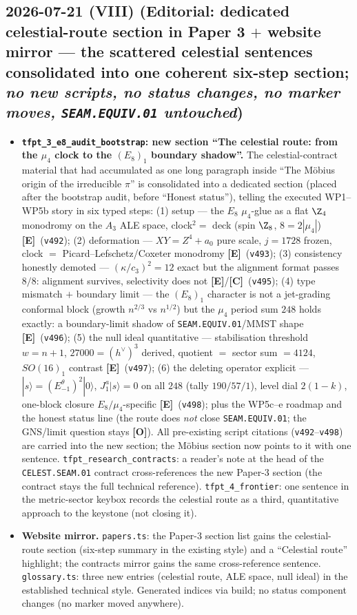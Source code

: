 \documentclass[11pt]{article}
\providecommand{\mE}{\textbf{[E]}}\providecommand{\mC}{\textbf{[C]}}
\providecommand{\mO}{\textbf{[O]}}\providecommand{\mX}{\textbf{[X]}}
\providecommand{\cthree}{c_3}\providecommand{\phiz}{\varphi_0^{\mathrm{ret}}}
\begin{document}
\subsection*{2026-07-21 (VIII) (Editorial: dedicated celestial-route section in Paper 3 $+$ website mirror --- the scattered celestial sentences consolidated into one coherent six-step section; \emph{no new scripts, no status changes, no marker moves, \texttt{SEAM.EQUIV.01} untouched})}
\begin{itemize}[leftmargin=1.5em]
\item \textbf{\texttt{tfpt\_3\_e8\_audit\_bootstrap}: new section ``The celestial route: from the
$\mu_4$ clock to the $(E_8)_1$ boundary shadow''.} The celestial-contract material that had accumulated
as one long paragraph inside ``The M\"obius origin of the irreducible $\pi$'' is consolidated into a
dedicated section (placed after the bootstrap audit, before ``Honest status''), telling the executed
WP1--WP5b story in six typed steps: (1) setup --- the $E_8$ $\mu_4$-glue as a flat $\Z_4$ monodromy on
the $A_3$ ALE space, clock$^2=$ deck (spin $\Z_8$, $8=2|\mu_4|$) \mE\ (\texttt{v492}); (2) deformation
--- $XY=Z^4{+}a_0$ pure scale, $j=1728$ frozen, clock $=$ Picard--Lefschetz/Coxeter monodromy \mE\
(\texttt{v493}); (3) consistency honestly demoted --- $(\kappa/\cthree)^2=12$ exact but the alignment
format passes $8/8$: alignment survives, selectivity does not \mE/\mC\ (\texttt{v495}); (4) type
mismatch $+$ boundary limit --- the $(E_8)_1$ character is not a jet-grading conformal block (growth
$n^{2/3}$ vs $n^{1/2}$) but the $\mu_4$ period sum $248$ holds exactly: a boundary-limit shadow of
\texttt{SEAM.EQUIV.01}/MMST shape \mE\ (\texttt{v496}); (5) the null ideal quantitative --- stabilisation
threshold $w=n{+}1$, $27000=(h^\vee)^3$ derived, quotient $=$ sector sum $=4124$, $SO(16)_1$ contrast
\mE\ (\texttt{v497}); (6) the deleting operator explicit --- $|s\rangle=(E^\theta_{-1})^2|0\rangle$,
$J^a_1|s\rangle=0$ on all $248$ (tally $190/57/1$), level dial $2(1{-}k)$, one-block closure
$E_8/\mu_4$-specific \mE\ (\texttt{v498}); plus the WP5c--e roadmap and the honest status line (the route
does \emph{not} close \texttt{SEAM.EQUIV.01}; the GNS/limit question stays \mO). All pre-existing script
citations (\texttt{v492}--\texttt{v498}) are carried into the new section; the M\"obius section now
points to it with one sentence. \texttt{tfpt\_research\_contracts}: a reader's note at the head of the \texttt{CELEST.SEAM.01}
contract cross-references the new Paper-3 section (the contract stays the full technical reference).
\texttt{tfpt\_4\_frontier}: one sentence in the metric-sector keybox records the celestial route as a
third, quantitative approach to the keystone (not closing it).
\item \textbf{Website mirror.} \texttt{papers.ts}: the Paper-3 section list gains the celestial-route
section (six-step summary in the existing style) and a ``Celestial route'' highlight; the contracts
mirror gains the same cross-reference sentence. \texttt{glossary.ts}: three new entries (celestial
route, ALE space, null ideal) in the established technical style. Generated indices via build; no
status component changes (no marker moved anywhere).
\end{itemize}
\end{document}

